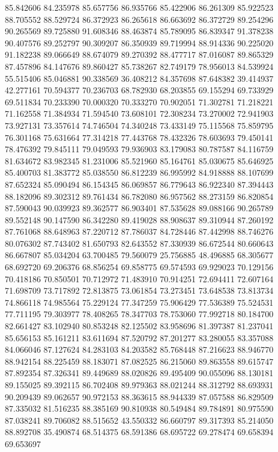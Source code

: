 85.842606
84.235978
85.657756
86.935766
85.422906
86.261309
85.922523
88.705552
88.529724
86.372923
86.265618
86.663692
86.372729
89.254296
90.265569
89.725880
91.608346
88.463874
85.789095
86.839347
91.378238
90.407576
89.252797
90.309207
86.350939
89.719994
88.914336
90.225020
91.182238
89.066649
88.674079
89.270392
88.477717
87.016087
89.865329
87.457896
84.147676
89.860427
85.738267
82.749179
78.956013
84.539924
55.515406
85.046881
90.338569
36.408212
84.357698
87.648382
39.414937
42.277161
70.594377
70.236703
68.782930
68.203855
69.155294
69.733929
69.511834
70.233390
70.000320
70.333270
70.902051
71.302781
71.218221
71.162558
71.384934
71.594540
73.608101
72.308234
73.270002
72.941903
73.927131
73.357614
74.746504
74.340248
73.433149
75.115568
75.859795
76.301168
75.631664
77.314218
77.443768
78.432326
78.603693
79.450141
78.476392
79.845111
79.049593
79.936903
83.179083
80.787587
84.116759
81.634672
83.982345
81.231006
85.521960
85.164761
85.030675
85.646925
85.400703
81.383772
85.038550
86.812239
86.995992
84.918888
88.107699
87.652324
85.090494
86.154345
86.069857
86.779643
86.922340
87.394443
88.182096
89.302312
89.761434
86.782080
86.957562
88.273159
86.820854
87.590043
90.039923
89.362577
86.903401
87.535628
89.088166
90.265789
89.552148
90.147590
86.342280
89.419028
88.908637
89.310944
87.260192
87.761068
88.648963
87.220712
87.786037
84.728446
87.442998
88.746276
80.076302
87.743402
81.650793
82.643552
87.330939
86.672544
80.660643
86.667807
85.034204
63.700485
79.560079
25.756885
48.496885
68.305677
68.692720
69.206376
68.856254
69.858775
69.574593
69.929023
70.129156
70.418186
70.850501
70.712972
71.483910
70.914251
72.694411
72.607164
71.698709
73.717892
72.813875
73.061854
73.273451
73.648538
73.813734
74.866118
74.985564
75.229124
77.347259
75.906429
77.536389
75.524531
77.711195
79.303977
78.408265
78.347703
78.753060
77.992718
80.184700
82.661427
83.102940
80.853248
82.125502
83.958696
81.397387
81.237041
85.656153
85.161211
83.611694
87.520792
87.201277
83.280055
83.357088
84.066046
87.127624
84.283103
84.203582
85.768448
87.216623
88.946770
88.942154
88.225459
88.183071
87.082525
86.215060
89.863558
89.615747
87.892354
87.326341
89.449689
88.020826
89.495409
90.055096
88.130181
89.155025
89.392115
86.702408
89.979363
88.021244
88.312792
88.693931
90.209439
89.062657
90.972153
88.363615
88.944339
87.057588
86.829509
87.335032
81.516235
88.385169
90.810938
80.549484
89.784891
80.975590
87.038241
89.706082
88.515652
43.550332
86.660797
89.317393
85.214050
88.892708
35.490874
68.514375
68.591386
68.695722
69.278474
69.658394
69.653697
